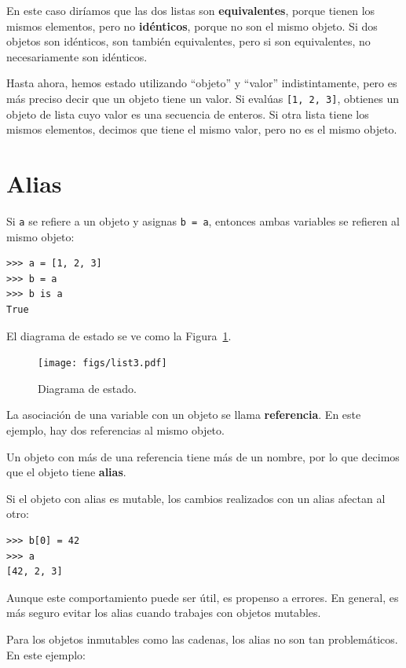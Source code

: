 \documentclass[10pt]{book}
\begin{document}
En este caso diríamos que las dos listas son {\bf equivalentes},
porque tienen los mismos elementos, pero no {\bf idénticos}, porque
no son el mismo objeto.  Si dos objetos son idénticos, son
también equivalentes, pero si son equivalentes, no necesariamente son
idénticos.

Hasta ahora, hemos estado utilizando ``objeto'' y ``valor''
indistintamente, pero es más preciso decir que un objeto tiene un
valor.  Si evalúas {\tt [1, 2, 3]}, obtienes un objeto de
lista cuyo valor es una secuencia de enteros.  Si otra
lista tiene los mismos elementos, decimos que tiene el mismo valor, pero
no es el mismo objeto.


\section{Alias}

Si {\tt a} se refiere a un objeto y asignas {\tt b = a},
entonces ambas variables se refieren al mismo objeto:

\begin{verbatim}
>>> a = [1, 2, 3]
>>> b = a
>>> b is a
True
\end{verbatim}
%
El diagrama de estado se ve como la Figura~\ref{fig.list3}.

\begin{figure}
\centerline
{\texttt{[image: figs/list3.pdf]}}
\caption{Diagrama de estado.}
\label{fig.list3}
\end{figure}

La asociación de una variable con un objeto se llama {\bf
referencia}.  En este ejemplo, hay dos referencias al mismo
objeto.

Un objeto con más de una referencia tiene más
de un nombre, por lo que decimos que el objeto tiene {\bf alias}.

Si el objeto con alias es mutable, los cambios realizados con un alias afectan
al otro:

\begin{verbatim}
>>> b[0] = 42
>>> a
[42, 2, 3]
\end{verbatim}
%
Aunque este comportamiento puede ser útil, es propenso a errores.  En general,
es más seguro evitar los alias cuando trabajes con objetos
mutables.

Para los objetos inmutables como las cadenas, los alias no son tan
problemáticos.  En este ejemplo:
\end{document}
